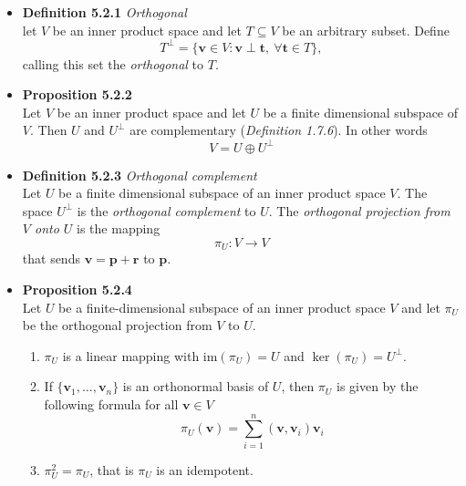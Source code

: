 \documentclass[11pt,a4paper]{article}
\begin{document}
\begin{itemize}

    \item \textbf{Definition 5.2.1} \emph{Orthogonal} \\
        let $V$ be an inner product space and let $T \subseteq V$ be an arbitrary subset.
        Define
        \[
            T^\perp = \{\mathbf{v} \in V : \mathbf{v} \perp \mathbf{t}, \ \forall
            \mathbf{t} \in T \},
        \]
        calling this set the \emph{orthogonal} to $T$.

    \item \textbf{Proposition 5.2.2} \\
        Let $V$ be an inner product space and let $U$ be a finite dimensional subspace of $V$.
        Then $U$ and $U^\perp$ are complementary (\emph{Definition 1.7.6}).
        In other words
        \[
            V = U \oplus U^\perp
        \]

    \item \textbf{Definition 5.2.3} \emph{Orthogonal complement} \\
        Let $U$ be a finite dimensional subspace of an inner product space $V$.
        The space $U^\perp$ is the \emph{orthogonal complement} to $U$.
        The \emph{orthogonal projection from $V$ onto $U$} is the mapping
        \[
            \pi_U : V \to V
        \]
        that sends $\mathbf{v} = \mathbf{p} + \mathbf{r}$ to $\mathbf{p}$.

    \item \textbf{Proposition 5.2.4} \\
        Let $U$ be a finite-dimensional subspace of an inner product space $V$ and let
        $\pi_U$ be the orthogonal projection from $V$ to $U$.
        \begin{enumerate}
            \item $\pi_U$ is a linear mapping with $\mathrm{im} (\pi_U) = U$ and
                $\ker(\pi_U) = U^\perp$.

            \item If $\{ \mathbf{v}_1, \ldots, \mathbf{v}_n\}$ is an orthonormal basis of $U$,
                then $\pi_U$ is given by the following formula for all $\mathbf{v} \in V$
                \[
                    \pi_U(\mathbf{v}) = \sum_{i=1}^n (\mathbf{v}, \mathbf{v}_i) \mathbf{v}_i
                \]
            \item $\pi_U^2 = \pi_U$, that is $\pi_U$ is an idempotent.
        \end{enumerate}


\end{itemize}
\end{document}
